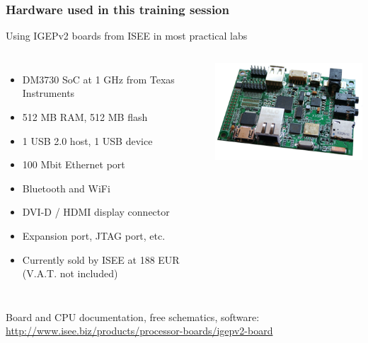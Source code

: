 \begin{frame}
\frametitle{Hardware used in this training session}
  Using IGEPv2 boards from ISEE in most practical labs
  \begin{columns}
    \begin{itemize}
      \item DM3730 SoC at 1 GHz from Texas Instruments
      \item 512 MB RAM, 512 MB flash
      \item 1 USB 2.0 host, 1 USB device
      \item 100 Mbit Ethernet port
      \item Bluetooth and WiFi
      \item DVI-D / HDMI display connector
      \item Expansion port, JTAG port, etc.
      \item Currently sold by ISEE at 188 EUR (V.A.T. not included)
    \end{itemize}
    \includegraphics[width=\textwidth]{slides/igepv2-board/igepv2-board.png}
  \end{columns}
  \vspace{1em}
  {\small
  Board and CPU documentation, free schematics, software:
  \url{http://www.isee.biz/products/processor-boards/igepv2-board}
  }
\end{frame}
